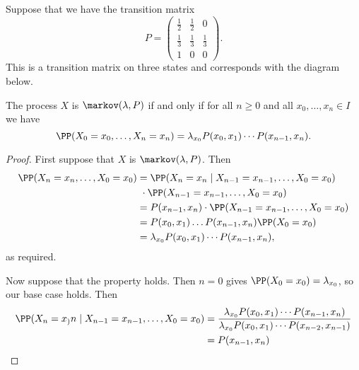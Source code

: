 \documentclass[a4paper]{scrartcl}
\begin{document}
\begin{example}
	Suppose that we have the transition matrix
	$$
	P = \begin{pmatrix}
		\frac{1}{2} & \frac{1}{2} & 0 \\
		\frac{1}{3} & \frac{1}{3} & \frac{1}{3} \\
		1 & 0 & 0 
	\end{pmatrix}.
	$$
	This is a transition matrix on three states and corresponds with the diagram below.

	\begin{center}
		\end{center}

\end{example}

\begin{theorem}
	The process $X$ is $\markov(\lambda, P)$ if and only if for all $n \geq 0$ and all $x_0, \dots, x_n \in I$ we have
	$$
	\PP(X_0 = x_0, \dots, X_n = x_n) = \lambda_{x_0} P(x_0, x_1) \cdots P(x_{n - 1}, x_n).
	$$
\end{theorem}
\begin{proof}
	First suppose that $X$ is $\markov(\lambda, P)$. Then
	\begin{align*}
		\PP(X_n = x_n, \dots, X_0 = x_0) &= \PP(X_n = x_n \mid X_{n - 1} = x_{n - 1} , \dots, X_0 = x_0) \\&\ \cdot \PP(X_{n - 1} = x_{n - 1} , \dots, X_0 = x_0)\\
		&= P(x_{n - 1}, x_n) \cdot \PP(X_{n - 1} = x_{n - 1} , \dots, X_0 = x_0) \\
		&= P(x_0, x_1) \dots P(x_{n - 1}, x_n) \PP(X_0 = x_0) \\
		&= \lambda_{x_0} P(x_0, x_1) \cdots P(x_{n - 1}, x_n),
	\end{align*}
	as required.

	Now suppose that the property holds. Then $n = 0$ gives $\PP(X_0 = x_0) = \lambda_{x_0}$, so our base case holds. Then
	\begin{align*}
		\PP(X_n = x_)n \mid X_{n - 1} = x_{n - 1} , \dots, X_0 = x_0) &= \frac{\lambda_{x_0}P(x_0, x_1)\cdots P(x_{n - 1}, x_n)}{\lambda_{x_0}P(x_0, x_1)\cdots P(x_{n - 2}, x_{n-1})}\\ 
		&= P(x_{n - 1}, x_n)
	\end{align*}
\end{proof}
\end{document}
